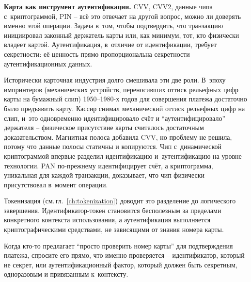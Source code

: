 \textbf{Карта как инструмент аутентификации.} CVV, CVV2, данные
чипа с~криптограммой, PIN -- всё это отвечает на другой вопрос,
можно ли доверять именно этой операции. Задача в~том, чтобы
подтвердить, что транзакцию инициировал законный держатель карты или,
как минимум, тот, кто физически владеет картой. Аутентификация,
в~отличие от идентификации, требует секретности: её ценность прямо
пропорциональна секретности аутентификационных данных.

Исторически карточная индустрия долго смешивала эти две роли.
В~эпоху импринтеров (механических устройств, переносивших оттиск
рельефных цифр карты на бумажный слип) 1950--1980-х годов для
совершения платежа достаточно было предъявить карту. Кассир снимал
механический оттиск рельефных цифр на слип, и~это одновременно идентифицировало счёт
и \enquote{аутентифицировало} держателя -- физическое присутствие
карты считалось достаточным доказательством. Магнитная полоса добавила
CVV, но проблему не решила, потому что данные полосы статичны
и копируются. Чип с~динамической криптограммой впервые разделил
идентификацию и~аутентификацию на уровне технологии. PAN по-прежнему
идентифицирует счёт, а криптограмма, уникальная для каждой транзакции,
доказывает, что чип физически присутствовал в~момент операции.

Токенизация (см.\,гл.~\ref{ch:tokenization}) доводит это разделение
до логического завершения. Идентификатор-токен становится
бесполезным за пределами конкретного контекста использования,
а аутентификация выполняется криптографическими средствами,
не зависящими от знания номера карты.

Когда кто-то предлагает \enquote{просто проверить номер карты}
для подтверждения платежа, спросите его прямо, что именно
проверяется -- идентификатор, который не секрет, или аутентификационный
фактор, который должен быть секретным, одноразовым и привязанным
к~контексту.
